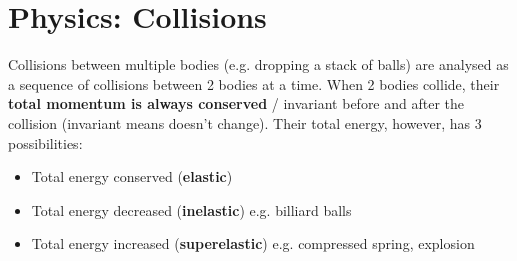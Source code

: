 \documentclass{article}
\begin{document}


\section{Physics: Collisions}
Collisions between multiple bodies (e.g. dropping a stack of balls) are analysed as a sequence of collisions between 2 bodies at a time. When 2 bodies collide, their \textbf{total momentum is always conserved} / invariant before and after the collision (invariant means doesn't change). Their total energy, however, has 3 possibilities:
\begin{itemize}
    \item Total energy conserved (\textbf{elastic})
    \item Total energy decreased (\textbf{inelastic}) e.g. billiard balls
    \item Total energy increased (\textbf{superelastic}) e.g. compressed spring, explosion
\end{itemize}
\end{document}
